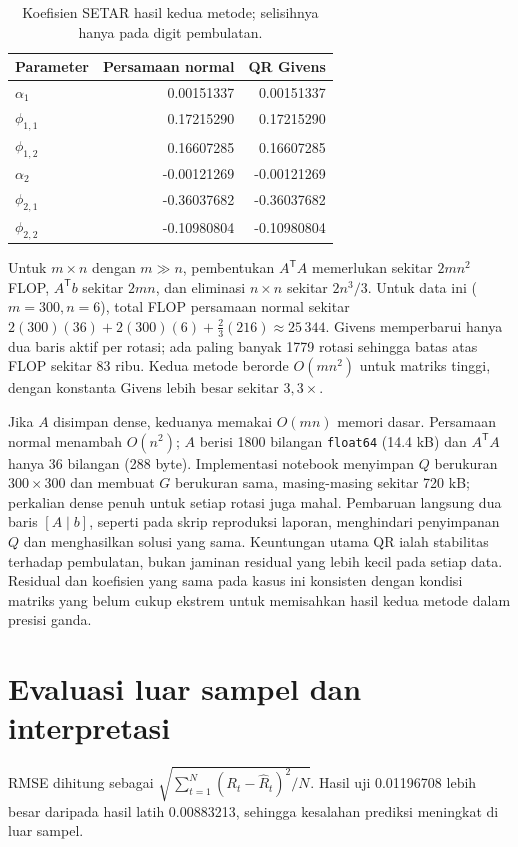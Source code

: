 \documentclass[12pt,a4paper]{article}
\numberwithin{equation}{section}
\begin{document}
\begin{table}[H]
\centering
\caption{Koefisien SETAR hasil kedua metode; selisihnya hanya pada digit pembulatan.}
\begin{tabular}{lrr}
\toprule
Parameter & Persamaan normal & QR Givens\\
\midrule
$\alpha_1$ & 0.00151337 & 0.00151337\\
$\phi_{1,1}$ & 0.17215290 & 0.17215290\\
$\phi_{1,2}$ & 0.16607285 & 0.16607285\\
$\alpha_2$ & -0.00121269 & -0.00121269\\
$\phi_{2,1}$ & -0.36037682 & -0.36037682\\
$\phi_{2,2}$ & -0.10980804 & -0.10980804\\
\bottomrule
\end{tabular}
\end{table}

Untuk $m\times n$ dengan $m\gg n$, pembentukan $A^\mathsf{T}A$ memerlukan sekitar $2mn^2$ FLOP, $A^\mathsf{T}b$ sekitar $2mn$, dan eliminasi $n\times n$ sekitar $2n^3/3$. Untuk data ini ($m=300,n=6$), total FLOP persamaan normal sekitar $2(300)(36)+2(300)(6)+\tfrac{2}{3}(216)\approx25\,344$. Givens memperbarui hanya dua baris aktif per rotasi; ada paling banyak 1779 rotasi sehingga batas atas FLOP sekitar 83 ribu. Kedua metode berorde $O(mn^2)$ untuk matriks tinggi, dengan konstanta Givens lebih besar sekitar $3{,}3\times$.

Jika $A$ disimpan dense, keduanya memakai $O(mn)$ memori dasar. Persamaan normal menambah $O(n^2)$; $A$ berisi 1800 bilangan \texttt{float64} (14.4 kB) dan $A^\mathsf{T}A$ hanya 36 bilangan (288 byte). Implementasi notebook menyimpan $Q$ berukuran $300\times300$ dan membuat $G$ berukuran sama, masing-masing sekitar 720 kB; perkalian dense penuh untuk setiap rotasi juga mahal. Pembaruan langsung dua baris $[A\mid b]$, seperti pada skrip reproduksi laporan, menghindari penyimpanan $Q$ dan menghasilkan solusi yang sama. Keuntungan utama QR ialah stabilitas terhadap pembulatan, bukan jaminan residual yang lebih kecil pada setiap data. Residual dan koefisien yang sama pada kasus ini konsisten dengan kondisi matriks yang belum cukup ekstrem untuk memisahkan hasil kedua metode dalam presisi ganda.

\section{Evaluasi luar sampel dan interpretasi}
RMSE dihitung sebagai $\sqrt{\sum_{t=1}^{N}(R_t-\widehat R_t)^2/N}$. Hasil uji 0.01196708 lebih besar daripada hasil latih 0.00883213, sehingga kesalahan prediksi meningkat di luar sampel.
\end{document}
